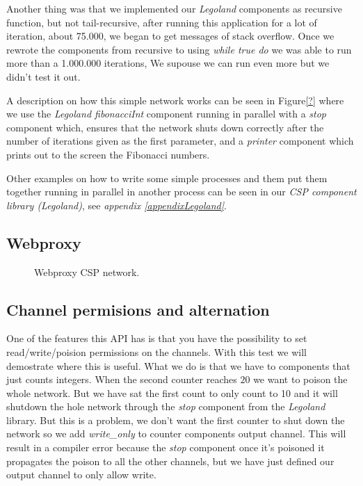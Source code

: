 \documentclass[a4paper,12pt]{article}
\begin{document}
Another thing was that we implemented our {\it Legoland} components as
recursive function, but not tail-recursive, after running this application
for a lot of iteration, about 75.000, we began to get messages of stack
overflow. Once we rewrote the components from recursive to using {\it while true
do} we was able to run more than a 1.000.000 iterations, We supouse we can
run even more but we didn't test it out.

A description on how this simple network works can be seen in Figure\ref{?}
where we use the {\it Legoland fibonacciInt} component running in parallel
with a {\it stop} component which, ensures that the network shuts down correctly
after the number of iterations given as the first parameter, and a {\it printer}
component which prints out to the screen the Fibonacci numbers.

Other examples on how to write some simple processes and them put them together
running in parallel in another process can be seen in our {\it CSP component 
library (Legoland\cite{vintercsp})}, see  {\it appendix \ref{appendixLegoland}}.

\subsection{Webproxy}
\begin{figure}[h]
  \begin{center}
  \end{center}
  \caption{Webproxy CSP network.}
\end{figure}

\subsection{Channel permisions and alternation}

One of the features this API has is that you have the possibility to set 
read/write/poision permissions on the channels. With this test we will
demostrate where this is useful. What we do is that we have to components
that just counts integers. When the second counter reaches $20$ we want
to poison the whole network. But we have sat the first count to only count
to 10 and it will shutdown the hole network through the {\it stop}
component from the {\it Legoland} library. But this is a problem, we don't
want the first counter to shut down the network so we add {\it write\_only}
to counter components output channel. This will result in a compiler error
because the {\it stop} component once it's poisoned it propagates the poison
to all the other channels, but we have just defined our output channel to
only allow write.
\end{document}
